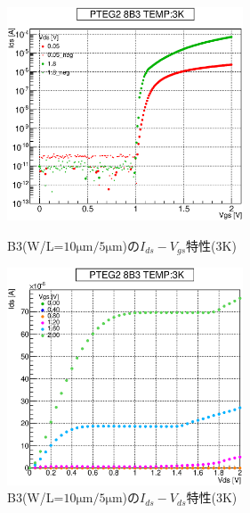 				\begin{figure}[htbp]
					\begin{minipage}{0.5\hsize}
						\begin{center}
							\includegraphics[width=70mm]{./Chapter/Appendix/Picture/NBT/B3/PTEG2_8_B3_IdVg_3K.eps}
						\end{center}
						\caption{B3(W/L=$10\mathrm{\mu m}/5\mathrm{\mu m}$)の$I_{ds}-V_{gs}$特性(3K)}
						\label{fig:B3_IdVg_3K}
					\end{minipage}
					\begin{minipage}{0.5\hsize}
						\begin{center}
							\includegraphics[width=70mm]{./Chapter/Appendix/Picture/NBT/B3/PTEG2_8_B3_IdVd_3K.eps}
						\end{center}
						\caption{B3(W/L=$10\mathrm{\mu m}/5\mathrm{\mu m}$)の$I_{ds}-V_{ds}$特性(3K)}
						\label{fig:B3_IdVd_3K}
					\end{minipage}
				\end{figure}

